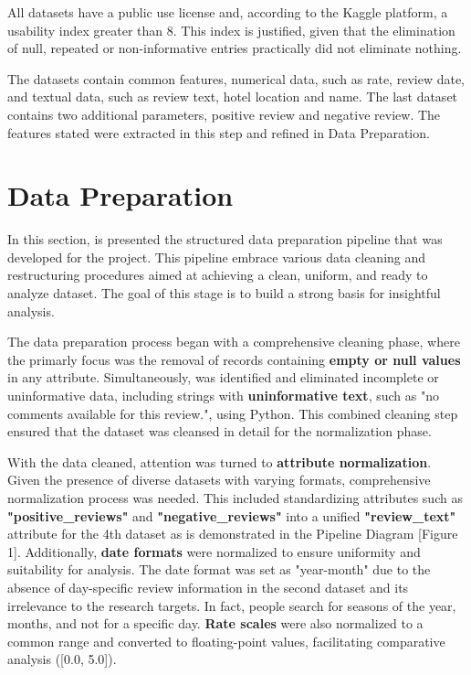 \documentclass[sigconf]{acmart}
\begin{document}
All datasets have a public use license and, according to the Kaggle platform, a usability index greater than 8. This index is justified, given that the elimination of null, repeated or non-informative entries practically did not eliminate nothing.

The datasets contain common features, numerical data, such as rate, review date, and textual data, such as review text, hotel location and name. The last dataset contains two additional parameters, positive review and negative review. The features stated were extracted in this step and refined in Data Preparation.


\section{Data Preparation}

In this section, is presented the structured data preparation pipeline that was developed for the project. This pipeline embrace various data cleaning and restructuring procedures aimed at achieving a clean, uniform, and ready to analyze dataset. The goal of this stage is to build a strong basis for insightful analysis.

The data preparation process began with a comprehensive cleaning phase, where the primarly focus was the removal of records containing \textbf{empty or null values} in any attribute. Simultaneously, was identified and eliminated incomplete or uninformative data, including strings with \textbf{uninformative text}, such as "no comments available for this review.", using Python. This combined cleaning step ensured that the dataset was cleansed in detail for the normalization phase.

With the data cleaned, attention was turned to \textbf{attribute normalization}. Given the presence of diverse datasets with varying formats, comprehensive normalization process was needed. This included standardizing attributes such as \textbf{"positive\_reviews"} and \textbf{"negative\_reviews"} into a unified \textbf{"review\_text"} attribute for the 4th dataset as is demonstrated in the Pipeline Diagram [Figure 1]. Additionally, \textbf{date formats} were normalized to ensure uniformity and suitability for analysis. The date format was set as "year-month" due to the absence of day-specific review information in the second dataset and its irrelevance to the research targets. In fact, people search for seasons of the year, months, and not for a specific day. \textbf{Rate scales} were also normalized to a common range and converted to floating-point values, facilitating comparative analysis ([0.0, 5.0]).
\end{document}
